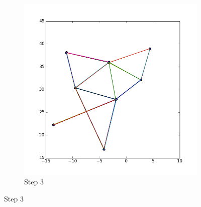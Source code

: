 \documentclass[12pt,a4paper]{article}
\begin{document}
\begin{figure} [htb]
\begin{minipage}[0.2\textheight]{\textwidth}
\begin{subfigure}{0.5\textwidth}
            \includegraphics[scale=0.3]{results_Harel/rand01/HK_step3_eps01.png}
            \caption{Step $3$}
     \end{subfigure}        
\end{minipage}


\end{figure}
\end{document}
